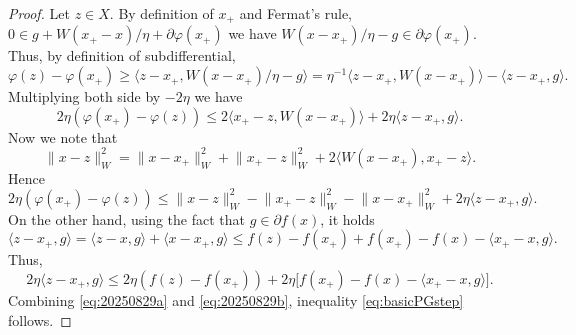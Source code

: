 \documentclass[11pt]{article}
\theoremstyle{plain}
\theoremstyle{definition}
\theoremstyle{remark}
\newcommand{\norm}[1]{\lVert{#1}\rVert}
\newcommand{\scalarp}[1]{\langle{#1}\rangle}
\newcommand{\pair}[2]{{\langle{{#1},{#2}}\rangle}}
\newcommand{\HH}{X}
\newcommand{\x}{x}
\newcommand{\uu}{g}
\newcommand{\reg}{\varphi}
\newcommand{\W}{W}
\begin{document}
\begin{proof}
Let $z\in X$.
By definition of $x_+$ and Fermat's rule, $0\in \uu + \W(\x_+-\x)/\eta +  \partial \reg(\x_+)$
we have $\W(x-x_+)/\eta - \uu\in \partial \reg(x_+)$. Thus, by definition of subdifferential,
\begin{equation*}
\reg(z)-\reg(x_+) \geq \pair{z-x_+}{\W(x-x_+)/\eta - \uu} = \eta^{-1}\pair{z-x_+}{\W(x-x_+)}
-\pair{z-x_+}{\uu}.
\end{equation*}
Multiplying both side by $-2\eta$ we have
\begin{equation*}
2\eta(\reg(x_+)-\reg(z)) \leq  2\pair{x_+-z}{\W(x-x_+)}
+2\eta\pair{z-x_+}{\uu}.
\end{equation*}
Now we note that
\begin{equation*}
\norm{\x- z}_{\W}^2 = \norm{\x - x_+}_{\W}^2 + \norm{\x_+-z}_{\W}^2 +2\pair{\W(\x-x_+)}{\x_+-z}.
\end{equation*}
Hence
\begin{equation}
\label{eq:20250829a}
2\eta(\reg(\x_+)-\reg(z)) \leq  \norm{\x- z}_{\W}^2 - \norm{\x_+-z}_{\W}^2 -\norm{\x - \x_+}_{\W}^2 
+2\eta\pair{z-x_+}{\uu}.
\end{equation}
On the other hand, using the fact that $\uu \in \partial f(\x)$, it holds
\begin{equation*}
\pair{z-\x_+}{\uu} = \pair{z-\x}{\uu} + \pair{\x-\x_+}{\uu}
\leq f(z)-f(\x_+) + f(\x_+)- f(\x) - \pair{\x_+-\x}{\uu}.
\end{equation*}
Thus, 
\begin{equation}
\label{eq:20250829b}
2\eta \pair{z-\x_+}{\uu} \leq 2\eta (f(z)-f(\x_+)) + 2 \eta \big[f(\x_+)- f(\x) - \pair{\x_+-\x}{\uu}\big].
\end{equation}
Combining \eqref{eq:20250829a} and \eqref{eq:20250829b}, inequality \eqref{eq:basicPGstep} follows.
%

\end{proof}
\end{document}

